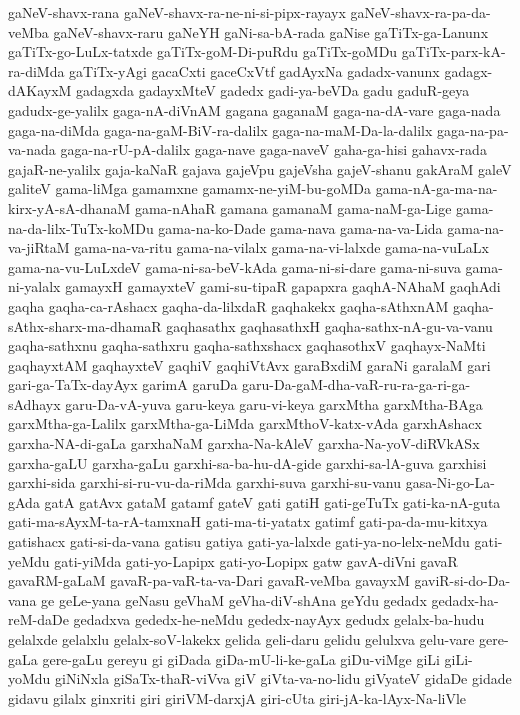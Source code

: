 {gaNeV-shavx-rana
gaNeV-shavx-ra-ne-ni-si-pipx-rayayx
gaNeV-shavx-ra-pa-da-veMba
gaNeV-shavx-raru
gaNeYH
gaNi-sa-bA-rada
gaNise
gaTiTx-ga-Lanunx
gaTiTx-go-LuLx-tatxde
gaTiTx-goM-Di-puRdu
gaTiTx-goMDu
gaTiTx-parx-kA-ra-diMda
gaTiTx-yAgi
gacaCxti
gaceCxVtf
gadAyxNa
gadadx-vanunx
gadagx-dAKayxM
gadagxda
gadayxMteV
gadedx
gadi-ya-beVDa
gadu
gaduR-geya
gadudx-ge-yalilx
gaga-nA-diVnAM
gagana
gaganaM
gaga-na-dA-vare
gaga-nada
gaga-na-diMda
gaga-na-gaM-BiV-ra-dalilx
gaga-na-maM-Da-la-dalilx
gaga-na-pa-va-nada
gaga-na-rU-pA-dalilx
gaga-nave
gaga-naveV
gaha-ga-hisi
gahavx-rada
gajaR-ne-yalilx
gaja-kaNaR
gajava
gajeVpu
gajeVsha
gajeV-shanu
gakAraM
galeV
galiteV
gama-liMga
gamamxne
gamamx-ne-yiM-bu-goMDa
gama-nA-ga-ma-na-kirx-yA-sA-dhanaM
gama-nAhaR
gamana
gamanaM
gama-naM-ga-Lige
gama-na-da-lilx-TuTx-koMDu
gama-na-ko-Dade
gama-nava
gama-na-va-Lida
gama-na-va-jiRtaM
gama-na-va-ritu
gama-na-vilalx
gama-na-vi-lalxde
gama-na-vuLaLx
gama-na-vu-LuLxdeV
gama-ni-sa-beV-kAda
gama-ni-si-dare
gama-ni-suva
gama-ni-yalalx
gamayxH
gamayxteV
gami-su-tipaR
gapapxra
gaqhA-NAhaM
gaqhAdi
gaqha
gaqha-ca-rAshacx
gaqha-da-lilxdaR
gaqhakekx
gaqha-sAthxnAM
gaqha-sAthx-sharx-ma-dhamaR
gaqhasathx
gaqhasathxH
gaqha-sathx-nA-gu-va-vanu
gaqha-sathxnu
gaqha-sathxru
gaqha-sathxshacx
gaqhasothxV
gaqhayx-NaMti
gaqhayxtAM
gaqhayxteV
gaqhiV
gaqhiVtAvx
garaBxdiM
garaNi
garalaM
gari
gari-ga-TaTx-dayAyx
garimA
garuDa
garu-Da-gaM-dha-vaR-ru-ra-ga-ri-ga-sAdhayx
garu-Da-vA-yuva
garu-keya
garu-vi-keya
garxMtha
garxMtha-BAga
garxMtha-ga-Lalilx
garxMtha-ga-LiMda
garxMthoV-katx-vAda
garxhAshacx
garxha-NA-di-gaLa
garxhaNaM
garxha-Na-kAleV
garxha-Na-yoV-diRVkASx
garxha-gaLU
garxha-gaLu
garxhi-sa-ba-hu-dA-gide
garxhi-sa-lA-guva
garxhisi
garxhi-sida
garxhi-si-ru-vu-da-riMda
garxhi-suva
garxhi-su-vanu
gasa-Ni-go-La-gAda
gatA
gatAvx
gataM
gatamf
gateV
gati
gatiH
gati-geTuTx
gati-ka-nA-guta
gati-ma-sAyxM-ta-rA-tamxnaH
gati-ma-ti-yatatx
gatimf
gati-pa-da-mu-kitxya
gatishacx
gati-si-da-vana
gatisu
gatiya
gati-ya-lalxde
gati-ya-no-lelx-neMdu
gati-yeMdu
gati-yiMda
gati-yo-Lapipx
gati-yo-Lopipx
gatw
gavA-diVni
gavaR
gavaRM-gaLaM
gavaR-pa-vaR-ta-va-Dari
gavaR-veMba
gavayxM
gaviR-si-do-Da-vana
ge
geLe-yana
geNasu
geVhaM
geVha-diV-shAna
geYdu
gedadx
gedadx-ha-reM-daDe
gedadxva
gededx-he-neMdu
gededx-nayAyx
gedudx
gelalx-ba-hudu
gelalxde
gelalxlu
gelalx-soV-lakekx
gelida
geli-daru
gelidu
gelulxva
gelu-vare
gere-gaLa
gere-gaLu
gereyu
gi
giDada
giDa-mU-li-ke-gaLa
giDu-viMge
giLi
giLi-yoMdu
giNiNxla
giSaTx-thaR-viVva
giV
giVta-va-no-lidu
giVyateV
gidaDe
gidade
gidavu
gilalx
ginxriti
giri
giriVM-darxjA
giri-cUta
giri-jA-ka-lAyx-Na-liVle
}
